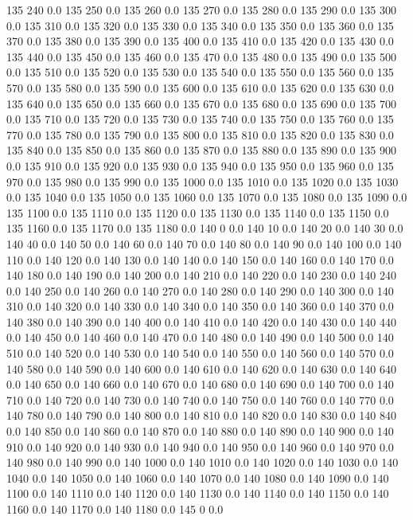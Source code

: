 135	240	0.0
135	250	0.0
135	260	0.0
135	270	0.0
135	280	0.0
135	290	0.0
135	300	0.0
135	310	0.0
135	320	0.0
135	330	0.0
135	340	0.0
135	350	0.0
135	360	0.0
135	370	0.0
135	380	0.0
135	390	0.0
135	400	0.0
135	410	0.0
135	420	0.0
135	430	0.0
135	440	0.0
135	450	0.0
135	460	0.0
135	470	0.0
135	480	0.0
135	490	0.0
135	500	0.0
135	510	0.0
135	520	0.0
135	530	0.0
135	540	0.0
135	550	0.0
135	560	0.0
135	570	0.0
135	580	0.0
135	590	0.0
135	600	0.0
135	610	0.0
135	620	0.0
135	630	0.0
135	640	0.0
135	650	0.0
135	660	0.0
135	670	0.0
135	680	0.0
135	690	0.0
135	700	0.0
135	710	0.0
135	720	0.0
135	730	0.0
135	740	0.0
135	750	0.0
135	760	0.0
135	770	0.0
135	780	0.0
135	790	0.0
135	800	0.0
135	810	0.0
135	820	0.0
135	830	0.0
135	840	0.0
135	850	0.0
135	860	0.0
135	870	0.0
135	880	0.0
135	890	0.0
135	900	0.0
135	910	0.0
135	920	0.0
135	930	0.0
135	940	0.0
135	950	0.0
135	960	0.0
135	970	0.0
135	980	0.0
135	990	0.0
135	1000	0.0
135	1010	0.0
135	1020	0.0
135	1030	0.0
135	1040	0.0
135	1050	0.0
135	1060	0.0
135	1070	0.0
135	1080	0.0
135	1090	0.0
135	1100	0.0
135	1110	0.0
135	1120	0.0
135	1130	0.0
135	1140	0.0
135	1150	0.0
135	1160	0.0
135	1170	0.0
135	1180	0.0
140	0	0.0
140	10	0.0
140	20	0.0
140	30	0.0
140	40	0.0
140	50	0.0
140	60	0.0
140	70	0.0
140	80	0.0
140	90	0.0
140	100	0.0
140	110	0.0
140	120	0.0
140	130	0.0
140	140	0.0
140	150	0.0
140	160	0.0
140	170	0.0
140	180	0.0
140	190	0.0
140	200	0.0
140	210	0.0
140	220	0.0
140	230	0.0
140	240	0.0
140	250	0.0
140	260	0.0
140	270	0.0
140	280	0.0
140	290	0.0
140	300	0.0
140	310	0.0
140	320	0.0
140	330	0.0
140	340	0.0
140	350	0.0
140	360	0.0
140	370	0.0
140	380	0.0
140	390	0.0
140	400	0.0
140	410	0.0
140	420	0.0
140	430	0.0
140	440	0.0
140	450	0.0
140	460	0.0
140	470	0.0
140	480	0.0
140	490	0.0
140	500	0.0
140	510	0.0
140	520	0.0
140	530	0.0
140	540	0.0
140	550	0.0
140	560	0.0
140	570	0.0
140	580	0.0
140	590	0.0
140	600	0.0
140	610	0.0
140	620	0.0
140	630	0.0
140	640	0.0
140	650	0.0
140	660	0.0
140	670	0.0
140	680	0.0
140	690	0.0
140	700	0.0
140	710	0.0
140	720	0.0
140	730	0.0
140	740	0.0
140	750	0.0
140	760	0.0
140	770	0.0
140	780	0.0
140	790	0.0
140	800	0.0
140	810	0.0
140	820	0.0
140	830	0.0
140	840	0.0
140	850	0.0
140	860	0.0
140	870	0.0
140	880	0.0
140	890	0.0
140	900	0.0
140	910	0.0
140	920	0.0
140	930	0.0
140	940	0.0
140	950	0.0
140	960	0.0
140	970	0.0
140	980	0.0
140	990	0.0
140	1000	0.0
140	1010	0.0
140	1020	0.0
140	1030	0.0
140	1040	0.0
140	1050	0.0
140	1060	0.0
140	1070	0.0
140	1080	0.0
140	1090	0.0
140	1100	0.0
140	1110	0.0
140	1120	0.0
140	1130	0.0
140	1140	0.0
140	1150	0.0
140	1160	0.0
140	1170	0.0
140	1180	0.0
145	0	0.0
